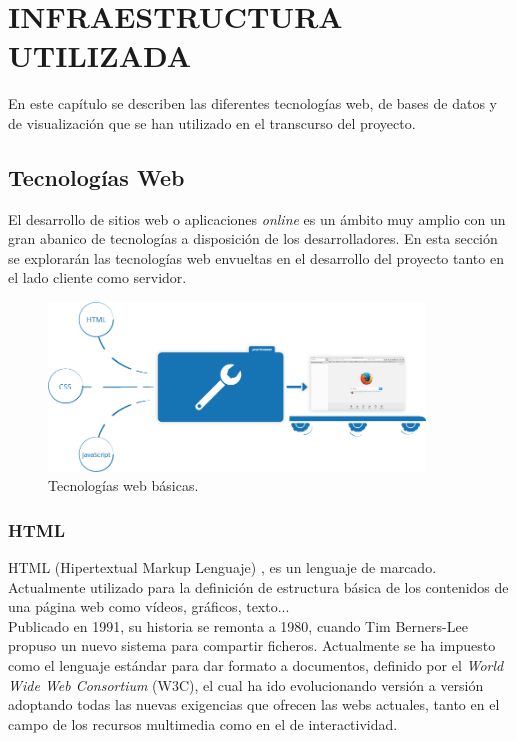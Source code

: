 \documentclass[11pt,a4paper]{book}
\begin{document}
	\chapter{INFRAESTRUCTURA UTILIZADA}
		En este capítulo se describen las diferentes tecnologías web, de bases de datos y de visualización que se han utilizado en el transcurso del proyecto.
		\section{Tecnologías Web}
			
			El desarrollo de sitios web o aplicaciones \textit{online} es un ámbito muy amplio con un gran abanico de tecnologías a disposición de los desarrolladores. En esta sección se explorarán las tecnologías web envueltas en el desarrollo del proyecto tanto en el lado cliente como servidor.
			\begin{figure}[H]
				\centering
				\includegraphics[width=10cm, keepaspectratio]{img/html_css_js.png}
				\caption{Tecnologías web básicas.}
				\label{fig:HTML_CSS_JS}
			\end{figure}
	
			\subsection{HTML}
				HTML (Hipertextual Markup Lenguaje) \cite{HTML}, es un lenguaje de marcado. Actualmente utilizado para la definición de  estructura básica de los contenidos de una página web como vídeos, gráficos, texto... \\
				
				Publicado en 1991, su historia se remonta a 1980, cuando Tim Berners-Lee propuso un nuevo sistema para compartir ficheros. Actualmente se ha impuesto como el lenguaje estándar para dar formato a documentos, definido por el \textit{World Wide Web Consortium} (W3C), el cual ha ido evolucionando versión a versión adoptando todas las nuevas exigencias que ofrecen las webs actuales, tanto en el campo de los recursos multimedia como en el de interactividad.\\
				
\end{document}
